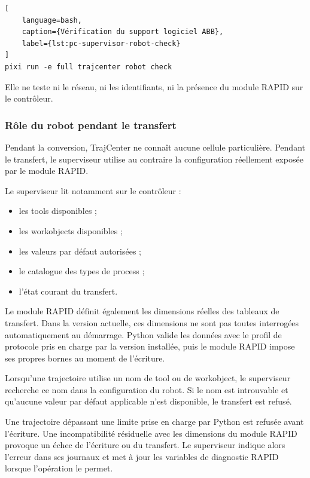 \documentclass{rapportENSAM}
\begin{document}
\begin{lstlisting}[
    language=bash,
    caption={Vérification du support logiciel ABB},
    label={lst:pc-supervisor-robot-check}
]
pixi run -e full trajcenter robot check
\end{lstlisting}

Elle ne teste ni le réseau, ni les identifiants, ni la présence du module
RAPID sur le contrôleur.

\subsubsection{Rôle du robot pendant le transfert}
\label{subsubsec:pc-robot-authority}

Pendant la conversion, TrajCenter ne connaît aucune cellule particulière.
Pendant le transfert, le superviseur utilise au contraire la configuration
réellement exposée par le module RAPID.

Le superviseur lit notamment sur le contrôleur :

\begin{itemize}
    \item les tools disponibles ;
    \item les workobjects disponibles ;
    \item les valeurs par défaut autorisées ;
    \item le catalogue des types de process ;
    \item l'état courant du transfert.
\end{itemize}

Le module RAPID définit également les dimensions réelles des tableaux de transfert. Dans la version actuelle, ces dimensions ne sont pas toutes interrogées automatiquement au démarrage. Python valide les données avec le profil de protocole pris en charge par la version installée, puis le module RAPID impose ses propres bornes au moment de l'écriture.


Lorsqu'une trajectoire utilise un nom de tool ou de workobject, le superviseur recherche ce nom dans la configuration du robot. Si le nom est introuvable et qu'aucune valeur par défaut applicable n'est disponible, le transfert est refusé.

Une trajectoire dépassant une limite prise en charge par Python est refusée avant l'écriture. Une incompatibilité résiduelle avec les dimensions du module RAPID provoque un échec de l'écriture ou du transfert. Le superviseur indique alors l'erreur dans ses journaux et met à jour les variables de diagnostic RAPID lorsque l'opération le permet.
\end{document}

